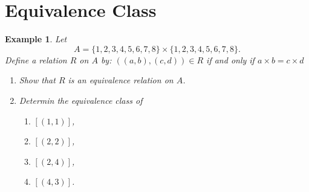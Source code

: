 \documentclass{../../cls/sig-alternate-05-2015}
\newtheorem{example}{Example}
\begin{document}
\section{Equivalence Class}
\begin{example}
    Let \begin{equation}
        A = \{1, 2, 3, 4, 5, 6, 7, 8\} \times \{1, 2, 3, 4, 5, 6, 7, 8\}.
    \end{equation} Define a relation $R$ on $A$ by: $((a, b), (c, d)) \in R$ if and only if $a \times b = c \times d$ \begin{enumerate}[label=(\alph*)]
        \item Show that $R$ is an equivalence relation on $A$.
        \item Determin the equivalence class of \begin{enumerate}[label=(\roman*)]
            \item $[(1, 1)]$,
            \item $[(2, 2)]$,
            \item $[(2, 4)]$,
            \item $[(4, 3)]$.
        \end{enumerate}
    \end{enumerate}
\end{example}
\end{document}
